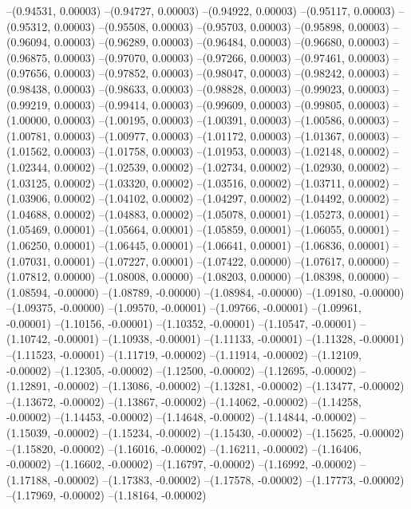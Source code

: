 --(0.94531, 0.00003)
--(0.94727, 0.00003)
--(0.94922, 0.00003)
--(0.95117, 0.00003)
--(0.95312, 0.00003)
--(0.95508, 0.00003)
--(0.95703, 0.00003)
--(0.95898, 0.00003)
--(0.96094, 0.00003)
--(0.96289, 0.00003)
--(0.96484, 0.00003)
--(0.96680, 0.00003)
--(0.96875, 0.00003)
--(0.97070, 0.00003)
--(0.97266, 0.00003)
--(0.97461, 0.00003)
--(0.97656, 0.00003)
--(0.97852, 0.00003)
--(0.98047, 0.00003)
--(0.98242, 0.00003)
--(0.98438, 0.00003)
--(0.98633, 0.00003)
--(0.98828, 0.00003)
--(0.99023, 0.00003)
--(0.99219, 0.00003)
--(0.99414, 0.00003)
--(0.99609, 0.00003)
--(0.99805, 0.00003)
--(1.00000, 0.00003)
--(1.00195, 0.00003)
--(1.00391, 0.00003)
--(1.00586, 0.00003)
--(1.00781, 0.00003)
--(1.00977, 0.00003)
--(1.01172, 0.00003)
--(1.01367, 0.00003)
--(1.01562, 0.00003)
--(1.01758, 0.00003)
--(1.01953, 0.00003)
--(1.02148, 0.00002)
--(1.02344, 0.00002)
--(1.02539, 0.00002)
--(1.02734, 0.00002)
--(1.02930, 0.00002)
--(1.03125, 0.00002)
--(1.03320, 0.00002)
--(1.03516, 0.00002)
--(1.03711, 0.00002)
--(1.03906, 0.00002)
--(1.04102, 0.00002)
--(1.04297, 0.00002)
--(1.04492, 0.00002)
--(1.04688, 0.00002)
--(1.04883, 0.00002)
--(1.05078, 0.00001)
--(1.05273, 0.00001)
--(1.05469, 0.00001)
--(1.05664, 0.00001)
--(1.05859, 0.00001)
--(1.06055, 0.00001)
--(1.06250, 0.00001)
--(1.06445, 0.00001)
--(1.06641, 0.00001)
--(1.06836, 0.00001)
--(1.07031, 0.00001)
--(1.07227, 0.00001)
--(1.07422, 0.00000)
--(1.07617, 0.00000)
--(1.07812, 0.00000)
--(1.08008, 0.00000)
--(1.08203, 0.00000)
--(1.08398, 0.00000)
--(1.08594, -0.00000)
--(1.08789, -0.00000)
--(1.08984, -0.00000)
--(1.09180, -0.00000)
--(1.09375, -0.00000)
--(1.09570, -0.00001)
--(1.09766, -0.00001)
--(1.09961, -0.00001)
--(1.10156, -0.00001)
--(1.10352, -0.00001)
--(1.10547, -0.00001)
--(1.10742, -0.00001)
--(1.10938, -0.00001)
--(1.11133, -0.00001)
--(1.11328, -0.00001)
--(1.11523, -0.00001)
--(1.11719, -0.00002)
--(1.11914, -0.00002)
--(1.12109, -0.00002)
--(1.12305, -0.00002)
--(1.12500, -0.00002)
--(1.12695, -0.00002)
--(1.12891, -0.00002)
--(1.13086, -0.00002)
--(1.13281, -0.00002)
--(1.13477, -0.00002)
--(1.13672, -0.00002)
--(1.13867, -0.00002)
--(1.14062, -0.00002)
--(1.14258, -0.00002)
--(1.14453, -0.00002)
--(1.14648, -0.00002)
--(1.14844, -0.00002)
--(1.15039, -0.00002)
--(1.15234, -0.00002)
--(1.15430, -0.00002)
--(1.15625, -0.00002)
--(1.15820, -0.00002)
--(1.16016, -0.00002)
--(1.16211, -0.00002)
--(1.16406, -0.00002)
--(1.16602, -0.00002)
--(1.16797, -0.00002)
--(1.16992, -0.00002)
--(1.17188, -0.00002)
--(1.17383, -0.00002)
--(1.17578, -0.00002)
--(1.17773, -0.00002)
--(1.17969, -0.00002)
--(1.18164, -0.00002)
